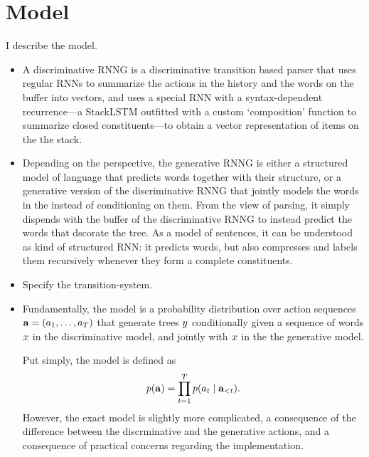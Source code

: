 % 

\section{Model}
I describe the model.
\begin{itemize}
  \item A discriminative RNNG is a discriminative transition based parser that uses regular RNNs to summarize the actions in the history and the words on the buffer into vectors, and uses a special RNN with a syntax-dependent recurrence---a StackLSTM \citep{ballesteros2017greedy} outfitted with a custom `composition' function to summarize closed constituents---to obtain a vector representation of items on the the stack.
  \item Depending on the perspective, the generative RNNG is either a structured model of language that predicts words together with their structure, or a generative version of the discriminative RNNG that jointly models the words in the instead of conditioning on them. From the view of parsing, it simply dispends with the buffer of the discriminative RNNG to instead predict the words that dscorate the tree. As a model of sentences, it can be understood as kind of structured RNN: it predicts words, but also compresses and labels them recursively whenever they form a complete constituents.
  \item Specify the transition-system.
  \item Fundamentally, the model is a probability distribution over action sequences $\mathbf{a} = ( a_1, \dots, a_T )$ that generate trees $y$ conditionally given a sequence of words $x$ in the discriminative model, and jointly with $x$ in the the generative model.

  Put simply, the model is defined as
  \begin{equation}
    \label{eq:naive-rnng-model}
    p(\mathbf{a}) = \prod_{t=1}^T p(a_t \mid \mathbf{a}_{<t}).
  \end{equation}
  However, the exact model is slightly more complicated, a consequence of the difference between the discrminative and the generative actions, and a consequence of practical concerns regarding the implementation.


\end{itemize}
